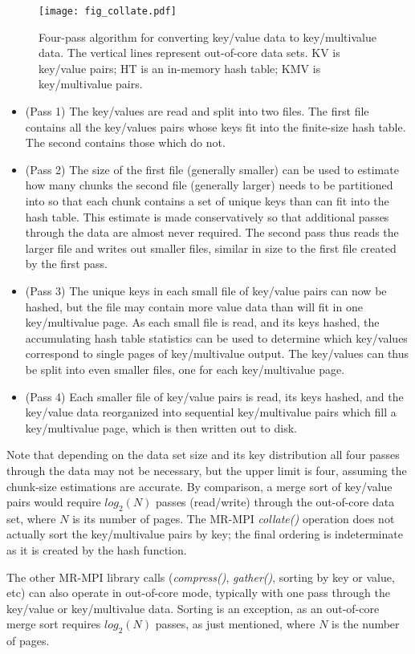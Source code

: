 \begin{figure}
\texttt{[image: fig\_collate.pdf]}
\caption{Four-pass algorithm for converting key/value data to
key/multivalue data.  The vertical lines represent out-of-core data
sets.  KV is key/value pairs; HT is an in-memory hash table; KMV is
key/multivalue pairs.}
\label{f:collate}
\end{figure}

\begin{itemize}

\item (Pass 1) The key/values are read and split into two files.  The
first file contains all the key/values pairs whose keys fit into the
finite-size hash table.  The second contains those which do not.

\item (Pass 2) The size of the first file (generally smaller) can be
used to estimate how many chunks the second file (generally larger)
needs to be partitioned into so that each chunk contains a set of
unique keys than can fit into the hash table.  This estimate is made
conservatively so that additional passes through the data are almost
never required.  The second pass thus reads the larger file and writes
out smaller files, similar in size to the first file created by the
first pass.

\item (Pass 3) The unique keys in each small file of key/value pairs
can now be hashed, but the file may contain more value data than will
fit in one key/multivalue page.  As each small file is read, and its
keys hashed, the accumulating hash table statistics can be used to
determine which key/values correspond to single pages of
key/multivalue output.  The key/values can thus be split into even
smaller files, one for each key/multivalue page.

\item (Pass 4) Each smaller file of key/value pairs is read, its keys
hashed, and the key/value data reorganized into sequential
key/multivalue pairs which fill a key/multivalue page, which is then
written out to disk.

\end{itemize}

Note that depending on the data set size and its key distribution all
four passes through the data may not be necessary, but the upper limit
is four, assuming the chunk-size estimations are accurate.  By
comparison, a merge sort of key/value pairs would require $log_2(N)$
passes (read/write) through the out-of-core data set, where $N$ is its
number of pages.  The MR-MPI {\it collate()} operation does not
actually sort the key/multivalue pairs by key; the final ordering is
indeterminate as it is created by the hash function.

The other MR-MPI library calls ({\it compress()}, {\it gather()},
sorting by key or value, etc) can also operate in out-of-core mode,
typically with one pass through the key/value or key/multivalue data.
Sorting is an exception, as an out-of-core merge sort requires
$log_2(N)$ passes, as just mentioned, where $N$ is the number of
pages.
